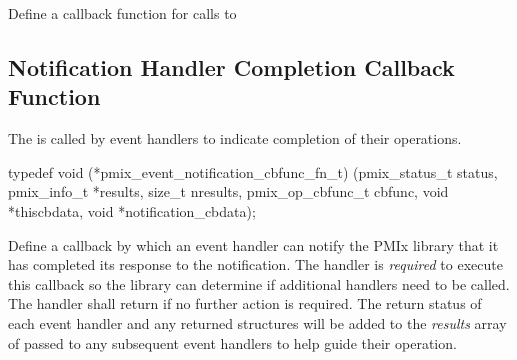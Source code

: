 \begin{arglist}
\end{arglist}


\descr

Define a callback function for calls to 


\subsection{Notification Handler Completion Callback Function}

\summary

The  is called by event handlers to indicate completion of their operations.

\cspecificstart
\begin{codepar}
typedef void (*pmix_event_notification_cbfunc_fn_t)
    (pmix_status_t status,
     pmix_info_t *results, size_t nresults,
     pmix_op_cbfunc_t cbfunc, void *thiscbdata,
     void *notification_cbdata);
\end{codepar}
\cspecificend

\begin{arglist}
\end{arglist}

\descr

Define a callback by which an event handler can notify the \ac{PMIx} library that it has completed its response to the notification. The handler is \textit{required} to execute this callback so the library can determine if additional handlers need to be called. The handler shall return  if no further action is required. The return status of each event handler and any returned  structures will be added to the \textit{results} array of  passed to any subsequent event handlers to help guide their operation.

